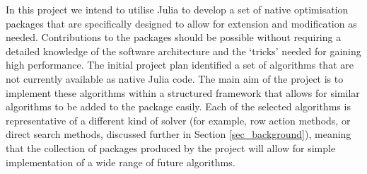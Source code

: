 In this project we intend to utilise Julia to develop a set of native optimisation packages that are specifically designed to allow for extension and modification as needed. Contributions to the packages should be possible without requiring a detailed knowledge of the software architecture and the `tricks' needed for gaining high performance. The initial project plan identified a set of algorithms that are not currently available as native Julia code. The main aim of the project is to implement these algorithms within a structured framework that allows for similar algorithms to be added to the package easily. Each of the selected algorithms is representative of a different kind of solver (for example, row action methods, or direct search methods, discussed further in Section \ref{sec_background}), meaning that the collection of packages produced by the project will allow for simple implementation of a wide range of future algorithms. 

